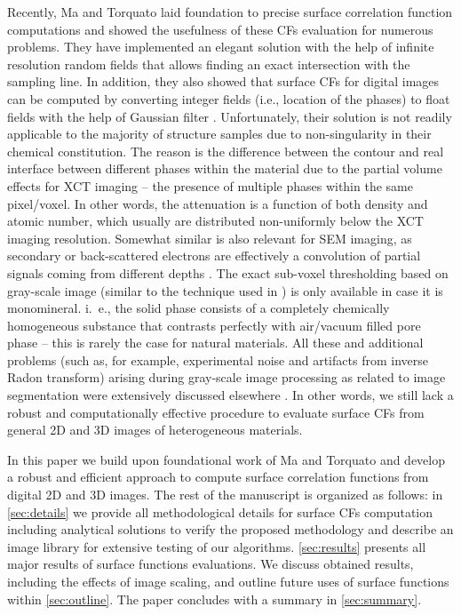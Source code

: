 \documentclass[reprint,amsmath,amssymb,aps,pre]{revtex4-1}
\begin{document}
Recently, Ma and Torquato \cite{Ma_Torq} laid foundation to precise surface
correlation function computations and showed the usefulness of these CFs
evaluation for numerous problems. They have implemented an elegant solution with
the help of infinite resolution random fields that allows finding an exact
intersection with the sampling line. In addition, they also showed that surface
CFs for digital images can be computed by converting integer fields (i.e.,
location of the phases) to float fields with the help of Gaussian filter
\cite{Ma_Torq}. Unfortunately, their solution is not readily applicable to the
majority of structure samples due to non-singularity in their chemical
constitution. The reason is the difference between the contour and real
interface between different phases within the material due to the partial volume
effects \cite{Wildenschild_Sheppard} for XCT imaging -- the presence of multiple
phases within the same pixel/voxel. In other words, the attenuation is a
function of both density and atomic number, which usually are distributed
non-uniformly below the XCT imaging resolution. Somewhat similar is also
relevant for SEM imaging, as secondary or back-scattered electrons are
effectively a convolution of partial signals coming from different depths
\cite{Bultreys_review}. The exact sub-voxel thresholding based on gray-scale
image (similar to the technique used in \cite{Ma_Torq}) is only available in
case it is monomineral. i.~e., the solid phase consists of a completely
chemically homogeneous substance that contrasts perfectly with air/vacuum filled
pore phase -- this is rarely the case for natural materials. All these and
additional problems (such as, for example, experimental noise and artifacts from
inverse Radon transform) arising during gray-scale image processing as related
to image segmentation were extensively discussed elsewhere
\cite{Safonov;Lavrukhin2021}. In other words, we still lack a robust and
computationally effective procedure to evaluate surface CFs from general 2D and
3D images of heterogeneous materials.

In this paper we build upon foundational work of Ma and Torquato \cite{Ma_Torq}
and develop a robust and efficient approach to compute surface correlation
functions from digital 2D and 3D images. The rest of the manuscript is organized
as follows: in \cref{sec:details} we provide all methodological details for
surface CFs computation including analytical solutions to verify the proposed
methodology and describe an image library for extensive testing of our
algorithms. \cref{sec:results} presents all major results of surface functions
evaluations. We discuss obtained results, including the effects of image
scaling, and outline future uses of surface functions within
\cref{sec:outline}. The paper concludes with a summary in \cref{sec:summary}.
\end{document}
